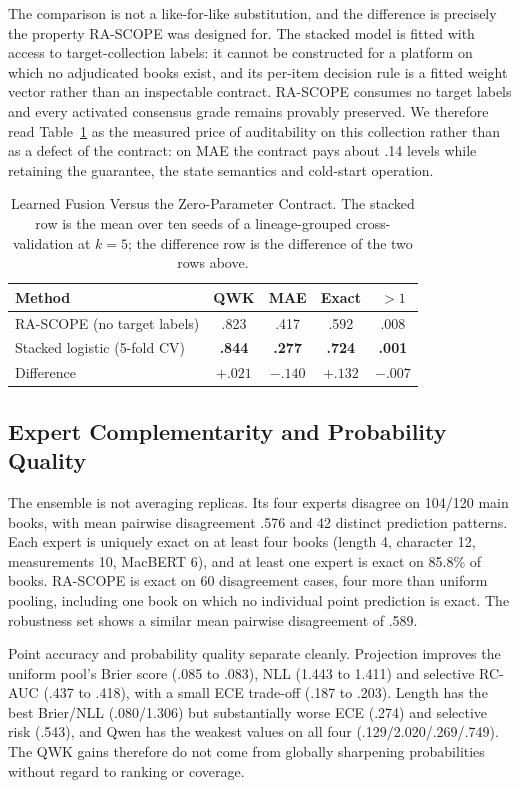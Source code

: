 \documentclass[conference]{IEEEtran}
\begin{document}
The comparison is not a like-for-like substitution, and the difference is
precisely the property RA-SCOPE was designed for. The stacked model is fitted
with access to target-collection labels: it cannot be constructed for a
platform on which no adjudicated books exist, and its per-item decision rule is
a fitted weight vector rather than an inspectable contract. RA-SCOPE consumes no
target labels and every activated consensus grade remains provably preserved.
We therefore read Table~\ref{tab_stack} as the measured price of auditability on
this collection rather than as a defect of the contract: on MAE the contract
pays about .14 levels while retaining the guarantee, the state semantics and
cold-start operation.

\begin{table}[t]
\caption{Learned Fusion Versus the Zero-Parameter Contract. The stacked row is
the mean over ten seeds of a lineage-grouped cross-validation at $k{=}5$; the
difference row is the difference of the two rows above.}
\label{tab_stack}
\centering
\footnotesize
\setlength{\tabcolsep}{5pt}
\begin{tabular}{lcccc}
\toprule
Method & QWK & MAE & Exact & $>\!1$ \\
\midrule
RA-SCOPE (no target labels)      & .823 & .417 & .592 & .008 \\
Stacked logistic (5-fold CV)     & \textbf{.844} & \textbf{.277} & \textbf{.724} & \textbf{.001} \\
\midrule
Difference                       & $+.021$ & $-.140$ & $+.132$ & $-.007$ \\
\bottomrule
\end{tabular}
\end{table}

\subsection{Expert Complementarity and Probability Quality}
The ensemble is not averaging replicas. Its four experts disagree on 104/120
main books, with mean pairwise disagreement .576 and 42 distinct prediction
patterns. Each expert is uniquely exact on at least four books (length 4,
character 12, measurements 10, MacBERT 6), and at least one expert is exact on
85.8\% of books. RA-SCOPE is exact on 60 disagreement cases, four more than
uniform pooling, including one book on which no individual point prediction is
exact. The robustness set shows a similar mean pairwise disagreement of .589.

Point accuracy and probability quality separate cleanly. Projection improves
the uniform pool's Brier score (.085 to .083), NLL (1.443 to 1.411) and
selective RC-AUC (.437 to .418), with a small ECE trade-off (.187 to .203).
Length has the best Brier/NLL (.080/1.306) but substantially worse ECE (.274)
and selective risk (.543), and Qwen has the weakest values on all four
(.129/2.020/.269/.749). The QWK gains therefore do not come from globally
sharpening probabilities without regard to ranking or coverage.
\end{document}

